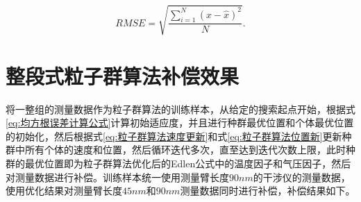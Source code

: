 \begin{equation}\label{eq:均方根误差计算公式}
  RMSE = \sqrt{\frac{\sum_{i=1}^{N}(x-\widehat x)^2}{N}}.
  \end{equation}


\section{整段式粒子群算法补偿效果}
将一整组的测量数据作为粒子群算法的训练样本，从给定的搜索起点开始，根据式\eqref{eq:均方根误差计算公式}计算初始适应度，并且进行种群最优位置和个体最优位置的初始化，然后根据式\eqref{eq:粒子群算法速度更新}和式\eqref{eq:粒子群算法位置新}更新种群中所有个体的速度和位置，然后循环迭代多次，直至达到迭代次数上限，此时种群的最优位置即为粒子群算法优化后的Edlen公式中的温度因子和气压因子，然后对测量数据进行补偿。训练样本统一使用测量臂长度$90nm$的干涉仪的测量数据，使用优化结果对测量臂长度$45nm$和$90nm$测量数据同时进行补偿，补偿结果如下。

